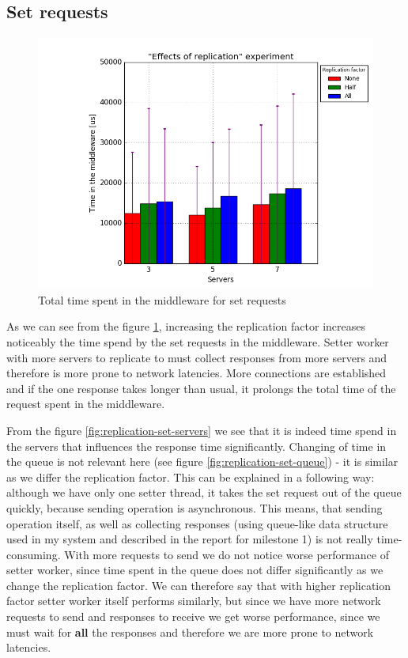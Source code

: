 \documentclass[11pt]{article}
\begin{document}
\subsection{Set requests}
\label{sec:replication-set}
\begin{figure}
\centering
	\includegraphics[width=0.7\linewidth]{plots/replication-set}

\caption{Total time spent in the middleware for set requests}
\label{fig:replication-set}
\end{figure}

As we can see from the figure \ref{fig:replication-set}, increasing the replication factor increases noticeably the time spend by the set requests in the middleware. Setter worker with more servers to replicate to must collect responses from more servers and therefore is more prone to network latencies. More connections are established and if the one response takes longer than usual, it prolongs the total time of the request spent in the middleware. 

From the figure \ref{fig:replication-set-servers} we see that it is indeed time spend in the servers that influences the response time significantly. Changing of time in the queue is not relevant here (see figure \ref{fig:replication-set-queue}) - it is similar as we differ the replication factor. This can be explained in a following way: although we have only one setter thread, it takes the set request out of the queue quickly, because sending operation is asynchronous. This means, that sending operation itself, as well as collecting responses (using queue-like data structure used in my system and described in the report for milestone 1) is not really time-consuming. With more requests to send we do not notice worse performance of setter worker, since time spent in the queue does not differ significantly as we change the replication factor. We can therefore say that with higher replication factor setter worker itself performs similarly, but since we have more network requests to send and responses to receive we get worse performance, since we must wait for {\bf all} the responses and therefore we are more prone to network latencies.
\end{document}
